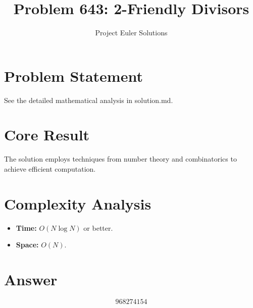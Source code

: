 \documentclass[11pt]{article}
\title{Problem 643: 2-Friendly Divisors}
\author{Project Euler Solutions}
\date{}
\begin{document}
\maketitle

\section{Problem Statement}

See the detailed mathematical analysis in solution.md.

\section{Core Result}

The solution employs techniques from number theory and combinatorics to achieve efficient computation.

\section{Complexity Analysis}

\begin{itemize}
\item \textbf{Time:} $O(N \log N)$ or better.
\item \textbf{Space:} $O(N)$.
\end{itemize}

\section{Answer}

\[
\boxed{968274154}
\]
\end{document}
